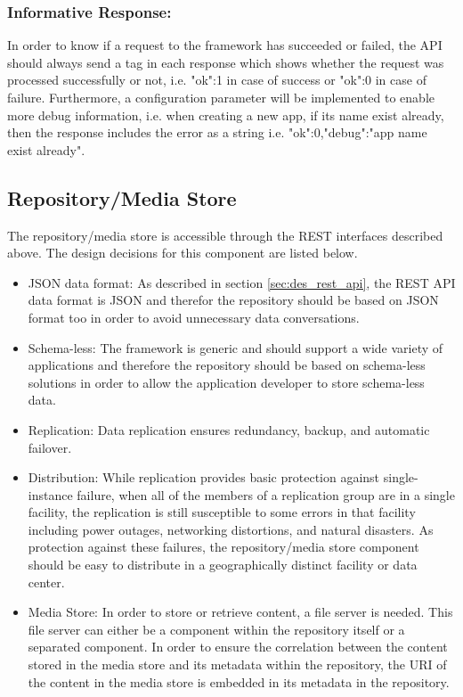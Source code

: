 \subsubsection{Informative Response:} In order to know if a request to the framework has succeeded or failed, the \ac{API} should always send a tag in each response which shows whether the request was processed successfully or not, i.e. {"ok":1} in case of success or {"ok":0} in case of failure. Furthermore, a configuration parameter will be implemented to enable more debug information, i.e. when creating a new app, if its name exist already, then the response includes the error as a string i.e. {"ok":0,"debug":"app name exist already"}.

\subsection{Repository/Media Store \label{sec:des_repo}}

The repository/media store is accessible through the \ac{REST} interfaces described above. The design decisions for this component are listed below.

\begin{itemize}
\item {JSON data format:} As described in section \ref{sec:des_rest_api}, the \ac{REST} \ac{API} data format is \ac{JSON} and therefor the repository should be based on \ac{JSON} format too in order to avoid unnecessary data conversations.

\item {Schema-less:} The framework is generic and should support a wide variety of applications and therefore the repository should be based on schema-less solutions in order to allow the application developer to store schema-less data.

\item {Replication:} Data replication ensures redundancy, backup, and automatic failover.

\item {Distribution:} While replication provides basic protection against single-instance failure, when all of the members of a replication group are in a single facility, the replication is still susceptible to some errors in that facility including power outages, networking distortions, and natural disasters. As protection against these failures, the repository/media store component should be easy to distribute in a geographically distinct facility or data center.

\item {Media Store:} In order to store or retrieve content, a file server is needed. This file server can either be a component within the repository itself or a separated component. In order to ensure the correlation between the content stored in the media store and its metadata within the repository, the \ac{URI} of the content in the media store is embedded in its metadata in the repository.
\end{itemize}
 
